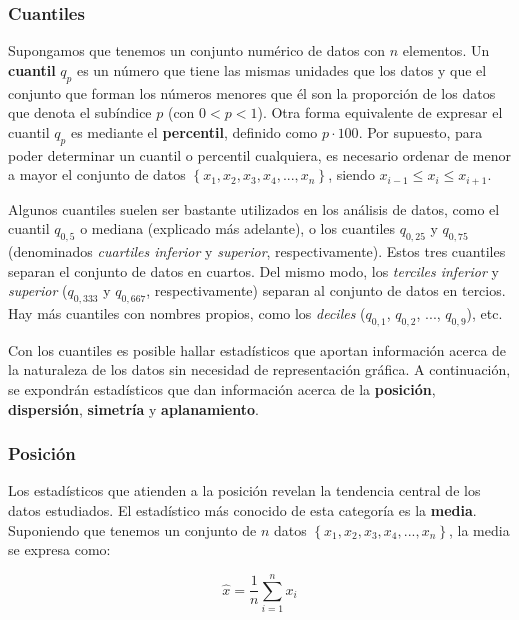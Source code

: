 \documentclass[12pt]{article}
\begin{document}
\subsubsection{Cuantiles}

Supongamos que tenemos un conjunto numérico de datos con $n$ elementos. Un \textbf{cuantil} $q_{p}$ es un número que tiene las mismas unidades que los datos y que el conjunto que forman los números menores que él son la proporción de los datos que denota el subíndice $p$ (con $0 < p < 1$). Otra forma equivalente de expresar el cuantil $q_{p}$ es mediante el \textbf{percentil}, definido como $p \cdot 100$. Por supuesto, para poder determinar un cuantil o percentil cualquiera, es necesario ordenar de menor a mayor el conjunto de datos  $\left\lbrace x_{1}, x_{2}, x_{3}, x_{4}, ..., x_{n} \right\rbrace$, siendo $ x_{i - 1} \leq x_{i} \leq x_{i + 1}$.

Algunos cuantiles suelen ser bastante utilizados en los análisis de datos, como el cuantil $q_{0,5}$ o mediana (explicado más adelante), o los cuantiles $q_{0,25}$ y $q_{0,75}$ (denominados \textit{cuartiles inferior} y \textit{superior}, respectivamente). Estos tres cuantiles separan el conjunto de datos en cuartos. Del mismo modo, los \textit{terciles inferior} y \textit{superior} ($q_{0,333}$ y $q_{0,667}$, respectivamente) separan al conjunto de datos en tercios. Hay más cuantiles con nombres propios, como los \textit{deciles} ($q_{0,1}$, $q_{0,2}$, ..., $q_{0,9}$), etc.

Con los cuantiles es posible hallar estadísticos que aportan información acerca de la naturaleza de los datos sin necesidad de representación gráfica. A continuación, se expondrán estadísticos que dan información acerca de la \textbf{posición}, \textbf{dispersión}, \textbf{simetría} y \textbf{aplanamiento}.

\subsubsection{Posición}

Los estadísticos que atienden a la posición revelan la tendencia central de los datos estudiados. El estadístico más conocido de esta categoría es la \textbf{media}. Suponiendo que tenemos un conjunto de $n$ datos $\left\lbrace x_{1}, x_{2}, x_{3}, x_{4}, ..., x_{n} \right\rbrace$, la media se expresa como:

\begin{equation}
\hat{x} = \frac{1}{n} \sum^{n}_{i = 1} x_{i}
\label{eq:mean}
\end{equation}
\end{document}
